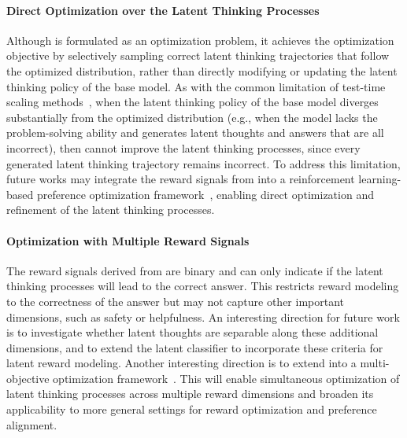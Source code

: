 \documentclass{article} %
\begin{document}
\paragraph*{Direct Optimization over the Latent Thinking Processes}Although \LTO is formulated as an optimization problem, it achieves the optimization objective by selectively sampling correct latent thinking trajectories that follow the optimized distribution, rather than directly modifying or updating the latent thinking policy of the base model. As with the common limitation of test-time scaling methods~\citep{gandhi2025cognitive,setlur2025scaling}, 
when the latent thinking policy of the base model diverges substantially from the optimized distribution (e.g., when the model lacks the problem-solving ability and generates latent thoughts and answers that are all incorrect), then \LTO cannot improve the latent thinking processes, since every generated latent thinking trajectory remains incorrect. To address this limitation, future works may integrate the reward signals from \LRM into a reinforcement learning-based preference optimization framework~\citep{rafailov2023direct}, enabling direct optimization and refinement of the latent thinking processes.

\paragraph*{Optimization with Multiple Reward Signals}The reward signals derived from \LTO are binary and can only indicate if the latent thinking processes will lead to the correct answer. This restricts reward modeling to the correctness of the answer but may not capture other important dimensions, such as safety or helpfulness. An interesting direction for future work is to investigate whether latent thoughts are separable along these additional dimensions, and to extend the latent classifier to incorporate these criteria for latent reward modeling. Another interesting direction is to extend \LTO into a multi-objective optimization framework~\citep{wang2025map}. This will enable simultaneous optimization of latent thinking processes across multiple reward dimensions and broaden its applicability to more general settings for reward optimization and preference alignment.
\end{document}
